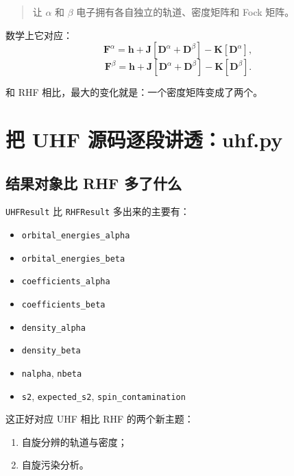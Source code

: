 \documentclass[UTF8,11pt,fontset=fandol]{ctexbook}
\begin{document}
\begin{quote}
让 $\alpha$ 和 $\beta$ 电子拥有各自独立的轨道、密度矩阵和 Fock 矩阵。
\end{quote}

数学上它对应：
\begin{equation}
\mathbf{F}^{\alpha}=\mathbf{h}+\mathbf{J}[\mathbf{D}^{\alpha}+\mathbf{D}^{\beta}]-\mathbf{K}[\mathbf{D}^{\alpha}],
\end{equation}
\begin{equation}
\mathbf{F}^{\beta}=\mathbf{h}+\mathbf{J}[\mathbf{D}^{\alpha}+\mathbf{D}^{\beta}]-\mathbf{K}[\mathbf{D}^{\beta}].
\end{equation}

和 RHF 相比，最大的变化就是：一个密度矩阵变成了两个。

\chapter{把 UHF 源码逐段讲透：uhf.py}

\section{结果对象比 RHF 多了什么}



\texttt{UHFResult} 比 \texttt{RHFResult} 多出来的主要有：
\begin{itemize}
  \item \texttt{orbital\_energies\_alpha}
  \item \texttt{orbital\_energies\_beta}
  \item \texttt{coefficients\_alpha}
  \item \texttt{coefficients\_beta}
  \item \texttt{density\_alpha}
  \item \texttt{density\_beta}
  \item \texttt{nalpha}, \texttt{nbeta}
  \item \texttt{s2}, \texttt{expected\_s2}, \texttt{spin\_contamination}
\end{itemize}

这正好对应 UHF 相比 RHF 的两个新主题：
\begin{enumerate}[label=\arabic*.]
  \item 自旋分辨的轨道与密度；
  \item 自旋污染分析。
\end{enumerate}
\end{document}
